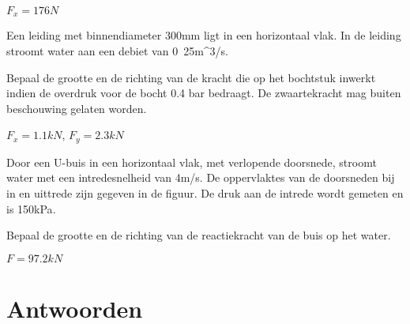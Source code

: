 	\begin{antwoord}
		$F_x = \unit{176}{N}$
	\end{antwoord}
	\begin{toepassing*}
		\label{45gradenbocht}
Een leiding met binnendiameter 300mm ligt in een horizontaal vlak. In de leiding stroomt water aan een debiet van \unit{0.25}{m^3/s}.    

Bepaal de grootte en de richting van de kracht die op het bochtstuk inwerkt indien de overdruk voor de bocht 0.4 bar bedraagt. De zwaartekracht mag buiten beschouwing gelaten worden.
		\begin{center}
			
		\end{center}
	\end{toepassing*}
	\begin{antwoord}
		$F_x = \unit{1.1}{kN}$, $F_y = \unit{2.3}{kN}$
	\end{antwoord}
	\begin{toepassing*}
		\label{diffusiebocht}
Door een U-buis in een horizontaal vlak, met verlopende doorsnede, stroomt water met een intredesnelheid van \unit{4}{m/s}. De oppervlaktes van de doorsneden bij in en uittrede zijn gegeven in de figuur. De druk aan de intrede wordt gemeten en is \unit{150}{kPa}.
		
Bepaal de grootte en de richting van de reactiekracht van de buis op het water.
		\begin{center}
			
		\end{center}
	\end{toepassing*}
	\begin{antwoord}
		$F = \unit{97.2}{kN}$
	\end{antwoord}
	
	\section*{Antwoorden}
	\begin{multicols}{2}
	\end{multicols}